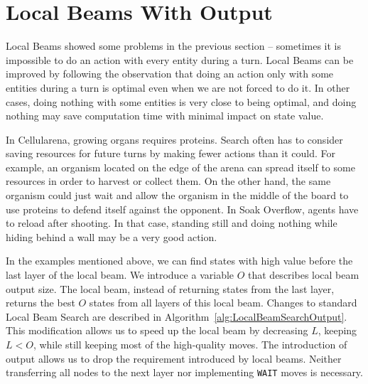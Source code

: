 \documentclass[shortabstract, mgr, english]{iithesis}
\begin{document}
\newpage
\section{Local Beams With Output}
\label{sec:LocalBeamsWithOutput}
Local Beams showed some problems in the previous section -- sometimes it is impossible to do an action with every entity during a turn. Local Beams can be improved by following the observation that doing an action only with some entities during a turn is optimal even when we are not forced to do it. In other cases, doing nothing with some entities is very close to being optimal, and doing nothing may save computation time with minimal impact on state value.

In Cellularena, growing organs requires proteins. Search often has to consider saving resources for future turns by making fewer actions than it could. For example, an organism located on the edge of the arena can spread itself to some resources in order to harvest or collect them. On the other hand, the same organism could just wait and allow the organism in the middle of the board to use proteins to defend itself against the opponent. In Soak Overflow, agents have to reload after shooting. In that case, standing still and doing nothing while hiding behind a wall may be a very good action.

In the examples mentioned above, we can find states with high value before the last layer of the local beam. We introduce a variable $O$ that describes local beam output size. The local beam, instead of returning states from the last layer, returns the best $O$ states from all layers of this local beam. Changes to standard Local Beam Search are described in Algorithm~\ref{alg:LocalBeamSearchOutput}. This modification allows us to speed up the local beam by decreasing $L$, keeping $L<O$, while still keeping most of the high-quality moves. The introduction of output allows us to drop the requirement introduced by local beams. Neither transferring all nodes to the next layer nor implementing \texttt{WAIT} moves is necessary.
\end{document}
